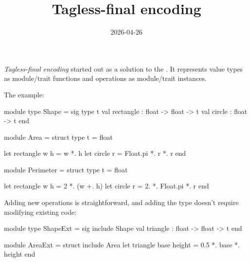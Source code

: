 \documentclass{note}
\title{Tagless-final encoding}
\date{2026-04-26}
\begin{document}
\emph{Tagless-final encoding} started out as a solution to the .
It represents value types as module/trait functions and operations as module/trait instances.

The  example:

\begin{code}[ocaml]
module type Shape = sig
  type t
  val rectangle : float -> float -> t
  val circle : float -> t
end

module Area = struct
  type t = float

  let rectangle w h = w *. h
  let circle r = Float.pi *. r *. r
end

module Perimeter = struct
  type t = float

  let rectangle w h = 2 *. (w +. h)
  let circle r = 2. *. Float.pi *. r
end
\end{code}

Adding new operations is straightforward,
and adding the  type doesn't require modifying existing code:

\begin{code}[ocaml]
module type ShapeExt = sig
  include Shape
  val triangle : float -> float -> t
end

module AreaExt = struct
  include Area
  let triangle base height = 0.5 *. base *. height
end
\end{code}
\end{document}

